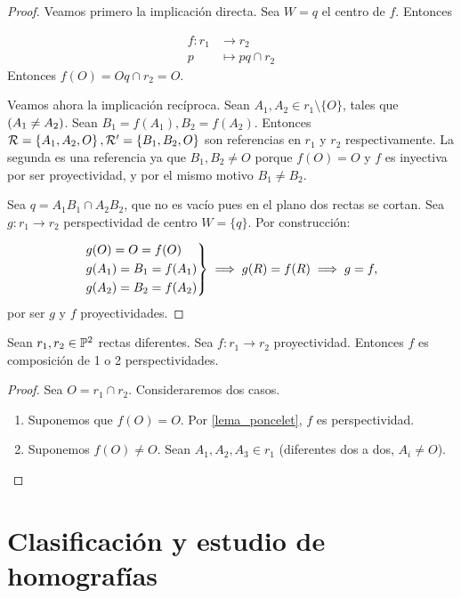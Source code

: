 \begin{proof}
    Veamos primero la implicación directa. Sea $W = {q}$
    el centro de $f$. Entonces

    \begin{align*}
	f : r_1 &\to r_2 \\
	p &\mapsto pq \cap r_2
    \end{align*}
    Entonces $f(O) = Oq \cap r_2 = O$.
    
    Veamos ahora la implicación recíproca. Sean $A_1, A_2 \in r_1
    \setminus \{O\}$, tales que $\left( A_1 \neq A_2\right)$. 
    Sean $B_1 = f(A_1), B_2 = f(A_2)$. Entonces $\mathcal{R} = \left \{ A_1, 
    A_2, O \right \}, \mathcal{R}' = \left \{ B_1, B_2, O \right \}$ son
    referencias en $r_1$ y $r_2$ respectivamente. La segunda 
    es una referencia ya que $B_1, B_2 \neq O$ porque $f(O) = O$ y
    $f$ es inyectiva por ser proyectividad, y por el mismo motivo
    $B_1 \neq B_2$.
    
    Sea $q = A_1B_1 \cap A_2B_2$, que no es vacío pues en el
    plano dos rectas se cortan. Sea $g \colon r_1 \to r_2$ 
    perspectividad de centro $W = \{ q\}$. Por construcción:
    
    \[
    \begin{rcases}
        g(O) = O = f(O) \\
        g(A_1) = B_1 = f(A_1) \\
        g(A_2) = B_2 = f(A_2)
    \end{rcases}
    \implies
    g(R) = f(R) \implies g = f,
    \]
    por ser $g$ y $f$ proyectividades.
\end{proof}
\begin{teo}
    Sean $r_1, r_2 \in \mathbb{P}^2$ rectas diferentes. Sea $f \colon 
    r_1 \to r_2$ proyectividad. Entonces $f$ es composición
    de 1 o 2 perspectividades.
\end{teo}
\begin{proof} %
    Sea $O = r_1 \cap r_2$. Consideraremos dos casos.
    \begin{enumerate}
        \item Suponemos que $f(O) = O$. Por \ref{lema_poncelet}, 
        $f$ es perspectividad.
        \item Suponemos $f(O) \neq O$. Sean $A_1, A_2, A_3 \in r_1$
        (diferentes dos a dos, $A_i \neq O$).
    \end{enumerate}
\end{proof}

\section{Clasificación y estudio de homografías}

